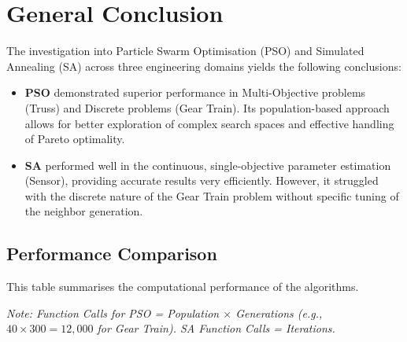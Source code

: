 \section{General Conclusion}

The investigation into Particle Swarm Optimisation (PSO) and Simulated Annealing (SA) across three engineering domains yields the following conclusions:

\begin{itemize}
    \item \textbf{PSO} demonstrated superior performance in Multi-Objective problems (Truss) and Discrete problems (Gear Train). Its population-based approach allows for better exploration of complex search spaces and effective handling of Pareto optimality.
    \item \textbf{SA} performed well in the continuous, single-objective parameter estimation (Sensor), providing accurate results very efficiently. However, it struggled with the discrete nature of the Gear Train problem without specific tuning of the neighbor generation.
\end{itemize}

\subsection{Performance Comparison}

This table summarises the computational performance of the algorithms.

\begin{table}[h!]
\centering
\caption{Algorithm Performance Metrics}
\end{table}

\textit{Note: Function Calls for PSO = Population $\times$ Generations (e.g., $40 \times 300 = 12,000$ for Gear Train). SA Function Calls = Iterations.}

